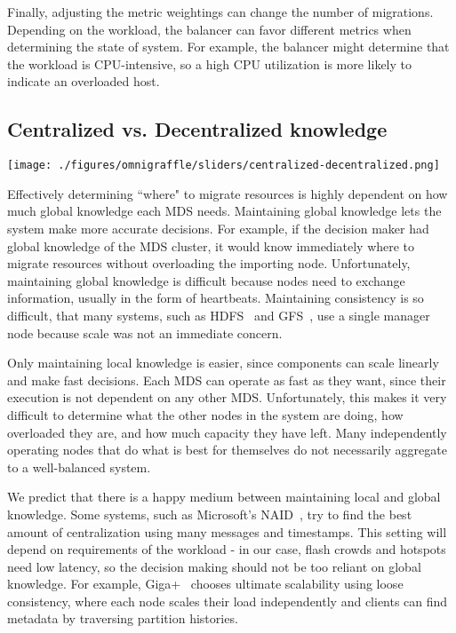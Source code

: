 Finally, adjusting the metric weightings can change the number of migrations. Depending on the workload, the balancer can favor different metrics when determining the state of system. For example, the balancer might determine that the workload is CPU-intensive, so a high CPU utilization is more likely to indicate an overloaded host. 

\subsection{Centralized vs. Decentralized knowledge}
\begin{minipage}{0.8\textwidth}
	\texttt{[image: ./figures/omnigraffle/sliders/centralized-decentralized.png]} 
	\vspace{0.2in}
\end{minipage}

Effectively determining ``where" to migrate resources is highly dependent on how much global knowledge each MDS needs. Maintaining global knowledge lets the system make more accurate decisions. For example, if the decision maker had global knowledge of the MDS cluster, it would know immediately where to migrate resources without overloading the importing node. Unfortunately, maintaining global knowledge is difficult because nodes need to exchange information, usually in the form of heartbeats. Maintaining consistency is so difficult, that many systems, such as HDFS~\cite{shvachko:login2012-hdfs-scalability} and GFS~\cite{ghemawat:sosp2003-gfs}, use a single manager node because scale was not an immediate concern.

Only maintaining local knowledge is easier, since components can scale linearly and make fast decisions. Each MDS can operate as fast as they want, since their execution is not dependent on any other MDS. Unfortunately, this makes it very difficult to determine what the other nodes in the system are doing, how overloaded they are, and how much capacity they have left. Many independently operating nodes that do what is best for themselves do not necessarily aggregate to a well-balanced system.

We predict that there is a happy medium between maintaining local and global knowledge.  Some systems, such as Microsoft's NAID~\cite{murray:sosp13-naiad}, try to find the best amount of centralization using many messages and timestamps. This setting will depend on requirements of the workload - in our case, flash crowds and hotspots need low latency, so the decision making should not be too reliant on global knowledge. For example, Giga+~\cite{patil:fast2011-giga+} chooses ultimate scalability using loose consistency, where each node scales their load independently and clients can find metadata by traversing partition histories. 


